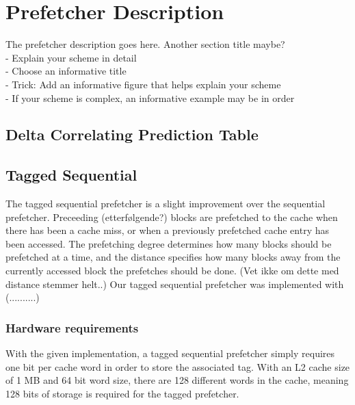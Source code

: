 \section{Prefetcher Description}
The prefetcher description goes here. Another section title maybe?
\\
- Explain your scheme in detail\\
- Choose an informative title\\
- Trick: Add an informative figure that helps explain 
your scheme\\
- If your scheme is complex, an informative example 
may be in order\\

\subsection{Delta Correlating Prediction Table}

\subsection{Tagged Sequential}
The tagged sequential prefetcher is a slight improvement over the sequential prefetcher. Preceeding (etterfølgende?) blocks are prefetched to the cache when there has been a cache miss, or when a previously prefetched cache entry has been accessed. The prefetching degree determines how many blocks should be prefetched at a time, and the distance specifies how many blocks away from the currently accessed block the prefetches should be done. (Vet ikke om dette med distance stemmer helt..) Our tagged sequential prefetcher was implemented with (..........) 

\subsubsection{Hardware requirements}
With the given implementation, a tagged sequential prefetcher simply requires one bit per cache word in order to store the associated tag. With an L2 cache size of 1 MB and 64 bit word size, there are 128 different words in the cache, meaning 128 bits of storage is required for the tagged prefetcher.
